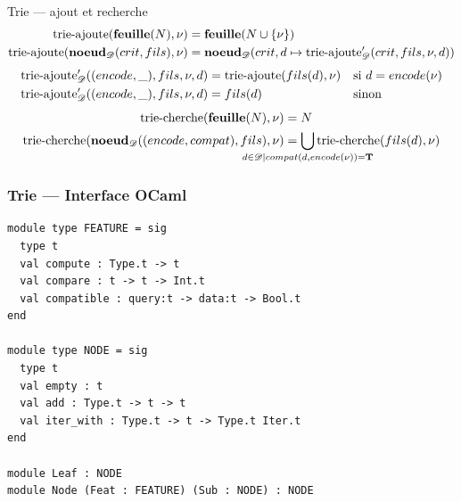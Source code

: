 \documentclass[serif]{beamer}
\newcommand{\mathhyphen}{{\hbox{-}}}
\begin{document}
\begin{frame}{Trie — ajout et recherche}
\scriptsize
\begin{align*}
		\mathrm{trie\mathhyphen ajoute} (\bold{feuille} (N), \nu) &=
		\bold{feuille} (N \cup \{ \nu \})
	\\
		\mathrm{trie\mathhyphen ajoute} (\bold{noeud}_\mathscr{D} (crit, fils), \nu) &=
		\bold{noeud}_\mathscr{D} (crit, d \mapsto \mathrm{trie\mathhyphen ajoute}_\mathscr{D}' (crit, fils, \nu, d))
\end{align*}
\begin{align*}
		\mathrm{trie\mathhyphen ajoute}_\mathscr{D}' ((encode, \_), fils, \nu, d) &=
		\mathrm{trie\mathhyphen ajoute} (fils (d), \nu) &&
		\text{si } d = encode (\nu)
	\\
		\mathrm{trie\mathhyphen ajoute}_\mathscr{D}' ((encode, \_), fils, \nu, d) &=
		fils (d) &&
		\text{sinon}
\end{align*}
\begin{align*}
		\mathrm{trie\mathhyphen cherche} (\bold{feuille} (N), \nu) &=
		N
	\\
		\mathrm{trie\mathhyphen cherche} (\bold{noeud}_\mathscr{D} ((encode, compat), fils), \nu) &=
		\bigcup_{\mathclap{{d \in \mathscr{D} \mid compat (d, encode (\nu)) = \bold{T}}}} \mathrm{trie\mathhyphen cherche} (fils (d), \nu)
\end{align*}
\end{frame}


\begin{frame}[fragile=singleslide]\frametitle{Trie — Interface OCaml}
\footnotesize
\begin{verbatim}
module type FEATURE = sig
  type t
  val compute : Type.t -> t
  val compare : t -> t -> Int.t
  val compatible : query:t -> data:t -> Bool.t
end

module type NODE = sig
  type t
  val empty : t
  val add : Type.t -> t -> t
  val iter_with : Type.t -> t -> Type.t Iter.t
end

module Leaf : NODE
module Node (Feat : FEATURE) (Sub : NODE) : NODE
\end{verbatim}
\end{frame}

\end{document}
